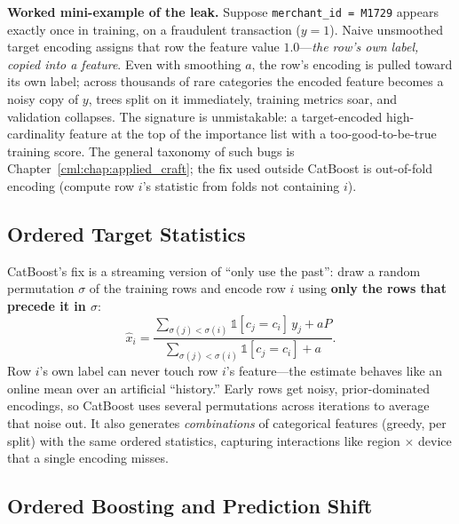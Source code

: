 \begin{warningbox}
\textbf{Worked mini-example of the leak.} Suppose \texttt{merchant\_id = M1729} appears exactly once in training, on a fraudulent transaction ($y=1$). Naive unsmoothed target encoding assigns that row the feature value $1.0$---\textit{the row's own label, copied into a feature}. Even with smoothing $a$, the row's encoding is pulled toward its own label; across thousands of rare categories the encoded feature becomes a noisy copy of $y$, trees split on it immediately, training metrics soar, and validation collapses. The signature is unmistakable: a target-encoded high-cardinality feature at the top of the importance list with a too-good-to-be-true training score. The general taxonomy of such bugs is Chapter~\ref{cml:chap:applied_craft}; the fix used outside CatBoost is out-of-fold encoding (compute row $i$'s statistic from folds not containing $i$).
\end{warningbox}

\subsection{Ordered Target Statistics}

CatBoost's fix is a streaming version of ``only use the past'': draw a random permutation $\sigma$ of the training rows and encode row $i$ using \textbf{only the rows that precede it in $\sigma$}:
\begin{equation}
\hat{x}_i = \frac{\sum_{\sigma(j) < \sigma(i)} \mathds{1}[c_j = c_i]\, y_j + a P}{\sum_{\sigma(j) < \sigma(i)} \mathds{1}[c_j = c_i] + a}.
\end{equation}
Row $i$'s own label can never touch row $i$'s feature---the estimate behaves like an online mean over an artificial ``history.'' Early rows get noisy, prior-dominated encodings, so CatBoost uses several permutations across iterations to average that noise out. It also generates \textit{combinations} of categorical features (greedy, per split) with the same ordered statistics, capturing interactions like region $\times$ device that a single encoding misses.

\subsection{Ordered Boosting and Prediction Shift}

